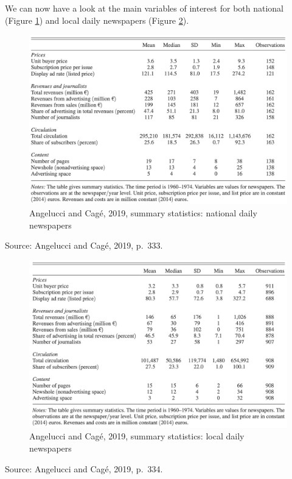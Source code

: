 \documentclass[
]{book}
\begin{document}
We can now have a look at the main variables of interest for both national (Figure \ref{fig:frenchnewspaperssummarystats}) and local daily newspapers (Figure \ref{fig:frenchlocalnewspaperssummarystats}).

\begin{figure}
\includegraphics[width=0.9\linewidth]{figures/french_national_newspapers_summary_stats} \caption{Angelucci and Cagé, 2019, summary statistics: national daily newspapers}\label{fig:frenchnewspaperssummarystats}
\end{figure}

Source: Angelucci and Cagé, 2019, p.~333.

\begin{figure}
\includegraphics[width=0.9\linewidth]{figures/french_local_newspapers_summary_stats} \caption{Angelucci and Cagé, 2019, summary statistics: local daily newspapers}\label{fig:frenchlocalnewspaperssummarystats}
\end{figure}

Source: Angelucci and Cagé, 2019, p.~334.
\end{document}
